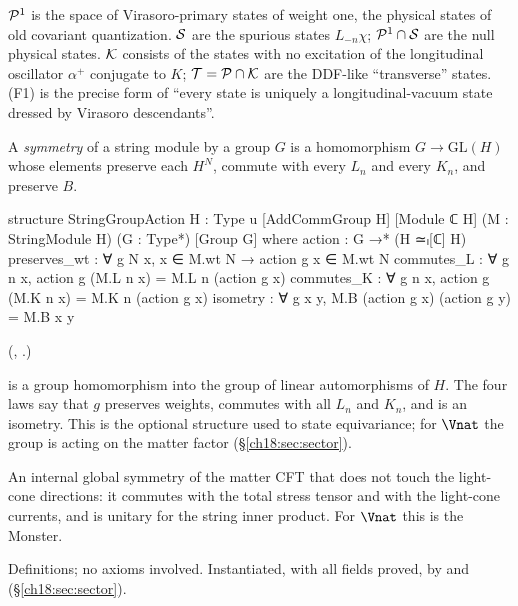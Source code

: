 \begin{physics}
$\mathcal{P}^1$ is the space of Virasoro-primary states of weight one, the physical states of old covariant
quantization.  $\mathcal{S}$ are the spurious states $L_{-n}\chi$; $\mathcal{P}^1\cap\mathcal{S}$ are the null physical states.
$\mathcal{K}$ consists of the states with no excitation of the longitudinal oscillator $\alpha^+$ conjugate to
$K$; $\mathcal{T}=\mathcal{P}\cap\mathcal{K}$ are the DDF-like ``transverse'' states.  (F1) is the precise form of ``every state
is uniquely a longitudinal-vacuum state dressed by Virasoro descendants''.
\end{physics}

\begin{definition}[Symmetries]\label{ch18:def:stringgroup}
A \emph{symmetry} of a string module by a group $G$ is a homomorphism $G\to\mathrm{GL}(H)$ whose
elements preserve each $H^N$, commute with every $L_n$ and every $K_n$, and preserve $B$.
\end{definition}
\begin{leancode}
structure StringGroupAction {H : Type u} [AddCommGroup H] [Module ℂ H]
    (M : StringModule H) (G : Type*) [Group G] where
  action : G →* (H ≃ₗ[ℂ] H)
  preserves_wt : ∀ g N x, x ∈ M.wt N → action g x ∈ M.wt N
  commutes_L : ∀ g n x, action g (M.L n x) = M.L n (action g x)
  commutes_K : ∀ g n x, action g (M.K n x) = M.K n (action g x)
  isometry : ∀ g x y, M.B (action g x) (action g y) = M.B x y
\end{leancode}
(, .)
\begin{dictionary}
 is a group homomorphism into the group of linear automorphisms of $H$.  The
four laws say that $g$ preserves weights, commutes with all $L_n$ and $K_n$, and is an isometry.  This is the optional structure used to state equivariance; for
$\Vnat$ the group is  acting on the matter factor (\S\ref{ch18:sec:sector}).
\end{dictionary}
\begin{physics}
An internal global symmetry of the matter CFT that does not touch the light-cone directions: it
commutes with the total stress tensor and with the light-cone currents, and is unitary for the string
inner product.  For $\Vnat$ this is the Monster.
\end{physics}
\begin{status}
Definitions; no axioms involved.  Instantiated, with all fields proved, by  and
 (\S\ref{ch18:sec:sector}).
\end{status}

